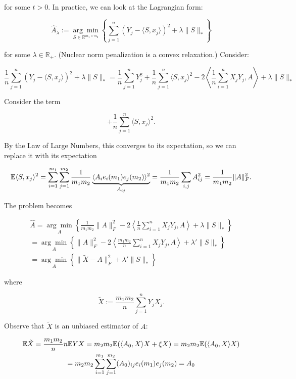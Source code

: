 \begin{example}
for some \(t > 0\). In practice, we can look at the Lagrangian form:

\[
\hat{A}_\lambda := \underset{S \in \mathbb{R}^{m_1 \times m_2}}{\arg \min} \left\{\sum_{j=1}^n (Y_j - \langle S, x_j \rangle )^2  + \lambda  \lVert S \rVert_*  \right\}
\]

for some \(\lambda \in \mathbb{R}_+\). (Nuclear norm penalization is a convex relaxation.) Consider:

\[
\frac{1}{n} \sum_{j=1}^n (Y_j - \langle S, x_j \rangle )^2  + \lambda  \lVert S \rVert_*
 = \frac{1}{n} \sum_{j=1}^n Y_j^2  + \frac{1}{n} \sum_{j=1}^n \langle S, x_j \rangle ^2  - 2 \left \langle \frac{1}{n} \sum_{i=1}^n X_j Y_j, A \right \rangle + \lambda  \lVert S \rVert_*
\]

Consider the term

\[
 + \frac{1}{n} \sum_{j=1}^n \langle S, x_j \rangle ^2 .
 \]

By the Law of Large Numbers, this converges to its expectation, so we can replace it with its expectation

\[
\mathbb{E}  \langle S, x_j \rangle ^2 = \sum_{i=1}^{m_1} \sum_{j=1}^{m_2} \frac{1}{m_1 m_2} \underbrace{ \langle A_i e_i(m_1) e_j(m_2)  \rangle^2}_{A_{ij}} = \frac{1}{m_1 m_2} \sum_{i,j} A_{ij}^2 = \frac{1}{m_1 m_2} \lVert A \rVert_F^2.
\]

The problem becomes 

\begin{multline*}
\hat{A} = \underset{A}{\arg \min} \left\{ \frac{1}{m_1 m_2} \lVert A \rVert_F^2 - 2   \left \langle \frac{1}{n} \sum_{i=1}^n X_j Y_j, A \right \rangle + \lambda  \lVert S \rVert_* \right\}
\\ = \underset{A}{\arg \min} \left\{ \lVert A \rVert_F^2 - 2   \left \langle \frac{m_ 1 m_2 }{n} \sum_{i=1}^n X_j Y_j, A \right \rangle + \lambda'  \lVert S \rVert_* \right\}
\\ = \underset{A}{\arg \min} \left\{ \lVert \tilde{X} - A \rVert_F^2 + \lambda'  \lVert S \rVert_* \right\}
\end{multline*} 

where 

\[
\tilde{X} := \frac{m_1 m_2}{n} \sum_{j=1}^n Y_j X_j.
\]

Observe that \(\tilde{X}\) is an unbiased estimator of \(A\):

\begin{multline*}
\mathbb{E} \tilde{X} = \frac{m_1 m_2}{n} n \mathbb{E} Y X = m_2 m_2 \mathbb{E}( \langle A_0, X \rangle X + \xi X) =  m_2 m_2 \mathbb{E}( \langle A_0, X \rangle X )
\\   = m_2 m_2 \sum_{i=1}^{m_1} \sum_{j=1}^{m_2} (A_0)_{ij} e_i (m_1) e_j(m_2) = A_0
\end{multline*}


\end{example}
